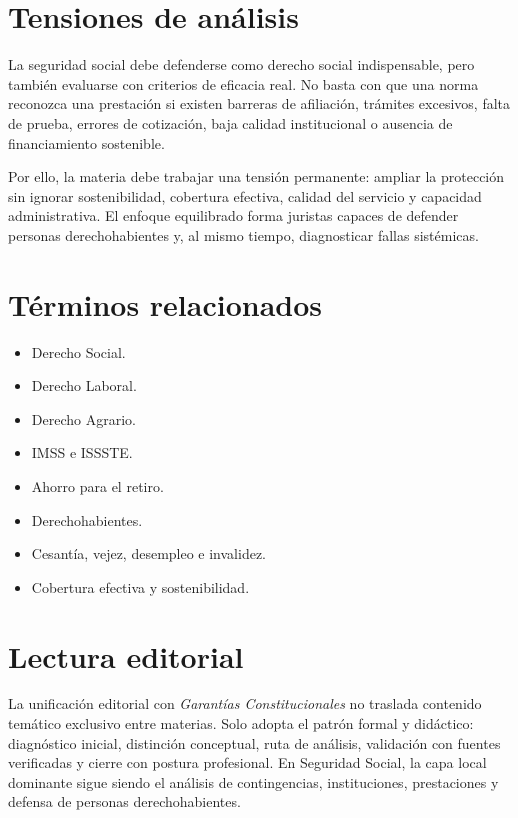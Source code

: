\documentclass[
  spanish,
  letterpaper, oneside
]{article}
\begin{document}
\section{Tensiones de análisis}

La seguridad social debe defenderse como derecho social indispensable, pero también evaluarse con criterios de eficacia real. No basta con que una norma reconozca una prestación si existen barreras de afiliación, trámites excesivos, falta de prueba, errores de cotización, baja calidad institucional o ausencia de financiamiento sostenible.

Por ello, la materia debe trabajar una tensión permanente: ampliar la protección sin ignorar sostenibilidad, cobertura efectiva, calidad del servicio y capacidad administrativa. El enfoque equilibrado forma juristas capaces de defender personas derechohabientes y, al mismo tiempo, diagnosticar fallas sistémicas.

\section{Términos relacionados}

\begin{itemize}
  \item Derecho Social.
  \item Derecho Laboral.
  \item Derecho Agrario.
  \item IMSS e ISSSTE.
  \item Ahorro para el retiro.
  \item Derechohabientes.
  \item Cesantía, vejez, desempleo e invalidez.
  \item Cobertura efectiva y sostenibilidad.
\end{itemize}

\section{Lectura editorial}

La unificación editorial con \textit{Garantías Constitucionales} no traslada contenido temático exclusivo entre materias. Solo adopta el patrón formal y didáctico: diagnóstico inicial, distinción conceptual, ruta de análisis, validación con fuentes verificadas y cierre con postura profesional. En Seguridad Social, la capa local dominante sigue siendo el análisis de contingencias, instituciones, prestaciones y defensa de personas derechohabientes.
\end{document}
